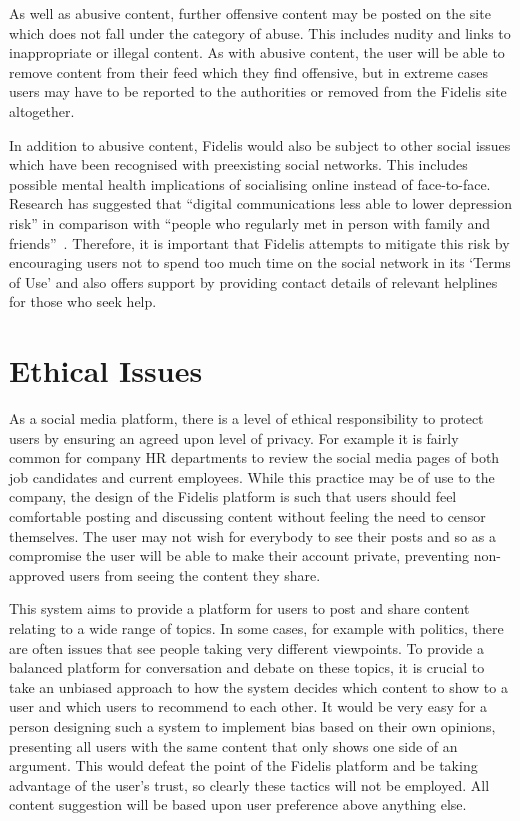 As well as abusive content, further offensive content may be posted on the site which does not fall under the category of abuse. This includes nudity and links to inappropriate or illegal content. As with abusive content, the user will be able to remove content from their feed which they find offensive, but in extreme cases users may have to be reported to the authorities or removed from the Fidelis site altogether.

In addition to abusive content, Fidelis would also be subject to other social issues which have been recognised with preexisting social networks. This includes possible mental health implications of socialising online instead of face-to-face. Research has suggested that ``digital communications less able to lower depression risk'' in comparison with ``people who regularly met in person with family and friends''~\cite{OHSU:Depression}. Therefore, it is important that Fidelis attempts to mitigate this risk by encouraging users not to spend too much time on the social network in its `Terms of Use' and also offers support by providing contact details of relevant helplines for those who seek help.

\section{Ethical Issues}
As a social media platform, there is a level of ethical responsibility to protect users by ensuring an agreed upon level of privacy. For example it is fairly common for company HR departments to review the social media pages of both job candidates and current employees. While this practice may be of use to the company, the design of the Fidelis platform is such that users should feel comfortable posting and discussing content without feeling the need to censor themselves. The user may not wish for everybody to see their posts and so as a compromise the user will be able to make their account private, preventing non-approved users from seeing the content they share.

This system aims to provide a platform for users to post and share content relating to a wide range of topics. In some cases, for example with politics, there are often issues that see people taking very different viewpoints. To provide a balanced platform for conversation and debate on these topics, it is crucial to take an unbiased approach to how the system decides which content to show to a user and which users to recommend to each other. It would be very easy for a person designing such a system to implement bias based on their own opinions, presenting all users with the same content that only shows one side of an argument. This would defeat the point of the Fidelis platform and be taking advantage of the user’s trust, so clearly these tactics will not be employed. All content suggestion will be based upon user preference above anything else.

